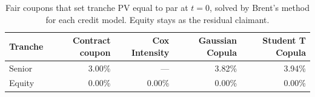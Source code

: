 
\begin{table}[ht]
\centering
\caption{Fair coupons that set tranche PV equal to par at $t = 0$, solved by Brent's method for each credit model. Equity stays as the residual claimant.}
\label{tab:fair-coupons}
\small
\begin{tabular}{l r r r r}
\toprule
Tranche & Contract coupon & Cox Intensity & Gaussian Copula & Student T Copula \\
\midrule
Senior & 3.00\% & — & 3.82\% & 3.94\% \\
Equity & 0.00\% & 0.00\% & 0.00\% & 0.00\% \\
\bottomrule
\end{tabular}
\end{table}
